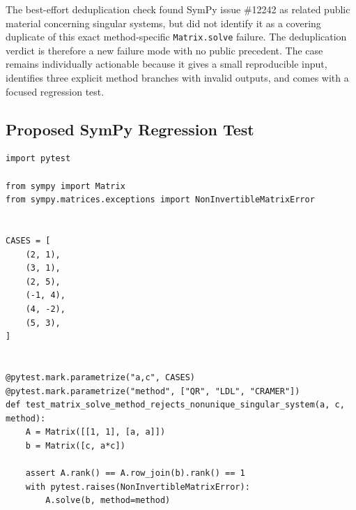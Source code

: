 \documentclass[11pt]{article}
\begin{document}
The best-effort deduplication check found SymPy issue \#12242 as related public material concerning singular systems, but did not identify it as a covering duplicate of this exact method-specific \texttt{Matrix.solve} failure. The deduplication verdict is therefore a new failure mode with no public precedent. The case remains individually actionable because it gives a small reproducible input, identifies three explicit method branches with invalid outputs, and comes with a focused regression test.

\subsection{Proposed SymPy Regression Test}

\medskip

\begin{lstlisting}[style=bugpython]
import pytest

from sympy import Matrix
from sympy.matrices.exceptions import NonInvertibleMatrixError


CASES = [
    (2, 1),
    (3, 1),
    (2, 5),
    (-1, 4),
    (4, -2),
    (5, 3),
]


@pytest.mark.parametrize("a,c", CASES)
@pytest.mark.parametrize("method", ["QR", "LDL", "CRAMER"])
def test_matrix_solve_method_rejects_nonunique_singular_system(a, c, method):
    A = Matrix([[1, 1], [a, a]])
    b = Matrix([c, a*c])

    assert A.rank() == A.row_join(b).rank() == 1
    with pytest.raises(NonInvertibleMatrixError):
        A.solve(b, method=method)
\end{lstlisting}
\end{document}
